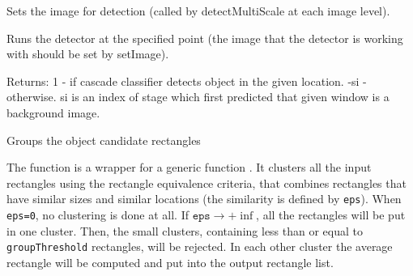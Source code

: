 Sets the image for detection (called by detectMultiScale at each image level).


\begin{description}
\end{description}

Runs the detector at the specified point (the image that the detector is working with should be set by setImage).


\begin{description}
\end{description}
Returns:
1 - if cascade classifier detects object in the given location.
-si - otherwise. si is an index of stage which first predicted that given window is a background image.

Groups the object candidate rectangles

\begin{description}
\end{description}

The function is a wrapper for a generic function . It clusters all the input rectangles using the rectangle equivalence criteria, that combines rectangles that have similar sizes and similar locations (the similarity is defined by \texttt{eps}). When \texttt{eps=0}, no clustering is done at all. If $\texttt{eps}\rightarrow +\inf$, all the rectangles will be put in one cluster. Then, the small clusters, containing less than or equal to \texttt{groupThreshold} rectangles, will be rejected. In each other cluster the average rectangle will be computed and put into the output rectangle list.
\fi

